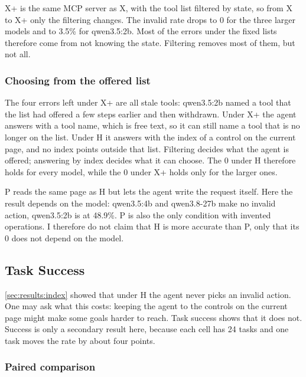 X+ is the same MCP server as X, with the tool list filtered by state, so from X to X+ only the filtering changes.
The invalid rate drops to 0 for the three larger models and to 3.5\% for qwen3.5:2b.
Most of the errors under the fixed lists therefore come from not knowing the state.
Filtering removes most of them, but not all.

\subsubsection{Choosing from the offered list}\label{sec:results:index}

The four errors left under X+ are all stale tools: qwen3.5:2b named a tool that the list had offered a few steps earlier and then withdrawn.
Under X+ the agent answers with a tool name, which is free text, so it can still name a tool that is no longer on the list.
Under H it answers with the index of a control on the current page, and no index points outside that list.
Filtering decides what the agent is offered; answering by index decides what it can choose.
The 0 under H therefore holds for every model, while the 0 under X+ holds only for the larger ones.

P reads the same page as H but lets the agent write the request itself.
Here the result depends on the model: qwen3.5:4b and qwen3.8-27b make no invalid action, qwen3.5:2b is at 48.9\%.
P is also the only condition with invented operations.
I therefore do not claim that H is more accurate than P, only that its 0 does not depend on the model.

\FloatBarrier

\subsection{Task Success}\label{sec:results:success}

\autoref{sec:results:index} showed that under H the agent never picks an invalid action.
One may ask what this costs: keeping the agent to the controls on the current page might make some goals harder to reach.
Task success shows that it does not.
Success is only a secondary result here, because each cell has 24 tasks and one task moves the rate by about four points.

\subsubsection{Paired comparison}\label{sec:results:paired}

